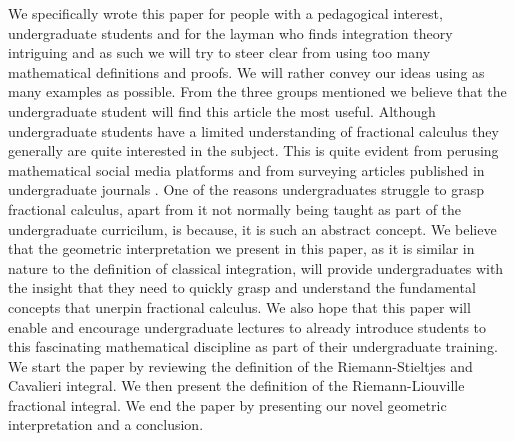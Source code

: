 \documentclass{article}
\theoremstyle{theorem}
\theoremstyle{definition}
\begin{document}
\noindent
We specifically wrote this paper for people with a pedagogical interest, undergraduate students and for the layman who finds integration theory intriguing and 
as such we will try to steer clear from using too many mathematical definitions and proofs. We will rather convey our ideas using as many examples as possible. From the 
three groups mentioned we believe that the undergraduate student will find this article the most useful. Although undergraduate students have a limited understanding of 
fractional calculus they generally are quite interested in the subject. This is quite evident from perusing mathematical social media platforms and from surveying 
articles published in undergraduate journals \cite{munkhammar05}. One of the reasons undergraduates struggle to grasp fractional calculus, apart from it not normally being taught as part of the undergraduate curricilum, is because, 
it is such an abstract concept. We believe that the geometric interpretation we present in this paper, as it is similar in nature to the definition of classical integration, will provide undergraduates with the insight that they need to quickly grasp and understand the fundamental 
concepts that unerpin fractional calculus. We also hope that this paper will enable and encourage undergraduate lectures to already introduce students to this fascinating mathematical discipline as part of their 
undergraduate training.\\

\noindent
We start the paper by reviewing the definition of the Riemann-Stieltjes and Cavalieri integral. We then present the definition of the Riemann-Liouville fractional integral. 
We end the paper by presenting our novel geometric interpretation and a conclusion.

\end{document}
